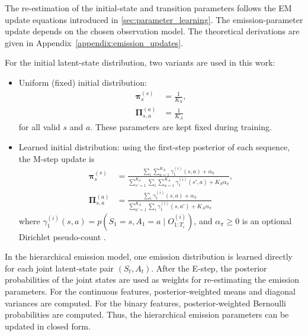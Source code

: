 \par The re-estimation of the initial-state and transition parameters follows the \ac{EM} update equations introduced in \autoref{sec:parameter_learning}. 
The emission-parameter update depends on the chosen observation model.
The theoretical derivations are given in Appendix~\ref{appendix:emission_updates}.

For the initial latent-state distribution, two variants are used in this work:
\begin{itemize}
    \item Uniform (fixed) initial distribution:
    \begin{align}
    \bm{\pi}^{(s)}_s &= \frac{1}{K_S}, \\
    \bm{\Pi}^{(a)}_{s,a} &= \frac{1}{K_A}
    \end{align}
    for all valid \(s\) and \(a\). These parameters are kept fixed during training.

    \item Learned initial distribution:
    using the first-step posterior of each sequence, the M-step update is
    \begin{align}
    \bm{\pi}^{(s)}_s
    &=
    \frac{\sum_i \sum_{a=1}^{K_A} \gamma_{1}^{(i)}(s,a) + \alpha_{\pi}}
    {\sum_{s'=1}^{K_S} \sum_i \sum_{a=1}^{K_A} \gamma_{1}^{(i)}(s',a) + K_S\alpha_{\pi}}, \\
    \bm{\Pi}^{(a)}_{s,a}
    &=
    \frac{\sum_i \gamma_{1}^{(i)}(s,a) + \alpha_{\pi}}
    {\sum_{a'=1}^{K_A} \sum_i \gamma_{1}^{(i)}(s,a') + K_A\alpha_{\pi}}
    \end{align}
    where \(\gamma_{1}^{(i)}(s,a)=p(S_1=s,A_1=a\mid O_{1:T_i}^{(i)})\), and \(\alpha_{\pi}\ge 0\) is an optional Dirichlet pseudo-count \cite{rabiner1989tutorial,pml1Book}.
\end{itemize}

\par In the hierarchical emission model, one emission distribution is learned directly for each joint latent-state pair \((S_t,A_t)\). 
After the E-step, the posterior probabilities of the joint states are used as weights for re-estimating the emission parameters. 
For the continuous features, posterior-weighted means and diagonal variances are computed. 
For the binary features, posterior-weighted Bernoulli probabilities are computed. 
Thus, the hierarchical emission parameters can be updated in closed form.  

